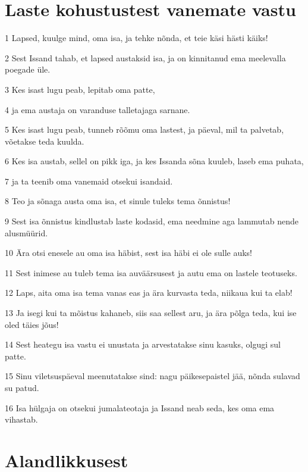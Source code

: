 \section*{Laste kohustustest vanemate vastu}

\par 1 Lapsed, kuulge mind, oma isa, ja tehke nõnda, et teie käsi hästi käiks!
\par 2 Sest Issand tahab, et lapsed austaksid isa, ja on kinnitanud ema meelevalla poegade üle.
\par 3 Kes isast lugu peab, lepitab oma patte,
\par 4 ja ema austaja on varanduse talletajaga sarnane.
\par 5 Kes isast lugu peab, tunneb rõõmu oma lastest, ja päeval, mil ta palvetab, võetakse teda kuulda.
\par 6 Kes isa austab, sellel on pikk iga, ja kes Issanda sõna kuuleb, laseb ema puhata,
\par 7 ja ta teenib oma vanemaid otsekui isandaid.
\par 8 Teo ja sõnaga austa oma isa, et sinule tuleks tema õnnistus!
\par 9 Sest isa õnnistus kindlustab laste kodasid, ema needmine aga lammutab nende alusmüürid.
\par 10 Ära otsi enesele au oma isa häbist, sest isa häbi ei ole sulle auks!
\par 11 Sest inimese au tuleb tema isa auväärsusest ja autu ema on lastele teotuseks.
\par 12 Laps, aita oma isa tema vanas eas ja ära kurvasta teda, niikaua kui ta elab!
\par 13 Ja isegi kui ta mõistus kahaneb, siis saa sellest aru, ja ära põlga teda, kui ise oled täies jõus!
\par 14 Sest heategu isa vastu ei unustata ja arvestatakse sinu kasuks, olgugi sul patte.
\par 15 Sinu viletsuspäeval meenutatakse sind: nagu päikesepaistel jää, nõnda sulavad su patud.
\par 16 Isa hülgaja on otsekui jumalateotaja ja Issand neab seda, kes oma ema vihastab.

\section*{Alandlikkusest}

